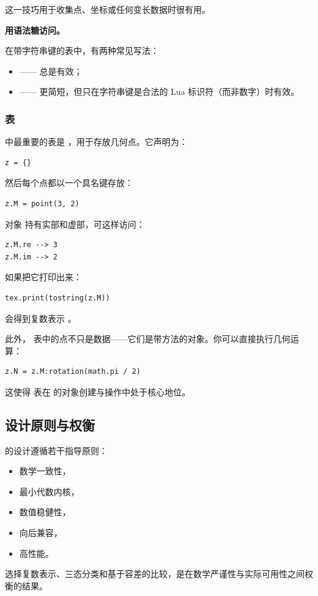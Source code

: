 这一技巧用于收集点、坐标或任何变长数据时很有用。

\textbf{用语法糖访问。}

在带字符串键的表中，有两种常见写法：

\begin{itemize}
\item {} —— 总是有效；
\item {} —— 更简短，但只在字符串键是合法的 Lua 标识符（而非数字）时有效。
\end{itemize}

\subsubsection{表 }

 中最重要的表是 ，用于存放几何点。它声明为：

\begin{verbatim}
z = {}
\end{verbatim}

然后每个点都以一个具名键存放：

\begin{mybox}
\begin{verbatim}
z.M = point(3, 2)
\end{verbatim}
\end{mybox}

对象  持有实部和虚部，可这样访问：

\begin{verbatim}
z.M.re --> 3
z.M.im --> 2
\end{verbatim}

如果把它打印出来：

\begin{verbatim}
tex.print(tostring(z.M))
\end{verbatim}

会得到复数表示 。

此外， 表中的点不只是数据——它们是带方法的对象。你可以直接执行几何运算：

\begin{verbatim}
z.N = z.M:rotation(math.pi / 2)
\end{verbatim}

这使得  表在  的对象创建与操作中处于核心地位。



\subsection{设计原则与权衡}


 的设计遵循若干指导原则：

\begin{itemize}
\item 数学一致性，
\item 最小代数内核，
\item 数值稳健性，
\item 向后兼容，
\item 高性能。
\end{itemize}

选择复数表示、三态分类和基于容差的比较，是在数学严谨性与实际可用性之间权衡的结果。
